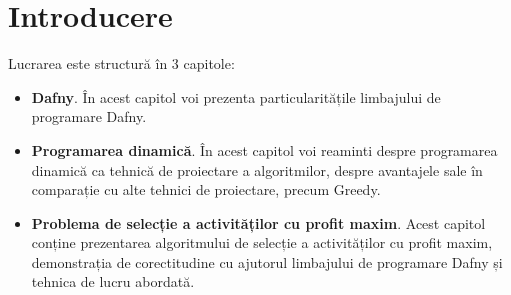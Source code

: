 \chapter*{Introducere} 

Lucrarea este structură în 3 capitole:

\begin{itemize}
  \item \textbf {Dafny}. În acest capitol voi prezenta particularitățile limbajului de programare Dafny.
  \item \textbf {Programarea dinamică}. În acest capitol voi reaminti despre programarea dinamică ca tehnică de proiectare a algoritmilor, despre avantajele sale în comparație cu alte tehnici de proiectare, precum Greedy. 
  \item \textbf {Problema de selecție a activităților cu profit maxim}. Acest capitol conține prezentarea algoritmului de selecție a activităților cu profit maxim, demonstrația de corectitudine cu ajutorul limbajului de programare Dafny și tehnica de lucru abordată. 
\end{itemize}
